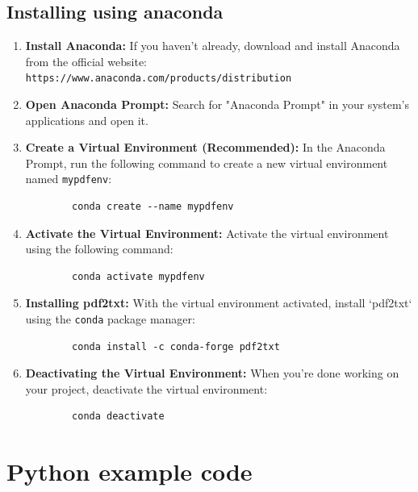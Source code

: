 \subsection{Installing using anaconda}

\begin{enumerate}[label=Step \arabic*:, leftmargin=*]
	\item \textbf{Install Anaconda:} If you haven't already, download and install Anaconda from the official website: \\
	\texttt{https://www.anaconda.com/products/distribution}
	
	\item \textbf{Open Anaconda Prompt:} Search for "Anaconda Prompt" in your system's applications and open it.
	
	\item \textbf{Create a Virtual Environment (Recommended):} In the Anaconda Prompt, run the following command to create a new virtual environment named \texttt{mypdfenv}:
	
	\begin{verbatim}
		conda create --name mypdfenv
	\end{verbatim}
	
	\item \textbf{Activate the Virtual Environment:} Activate the virtual environment using the following command:
	
	\begin{verbatim}
		conda activate mypdfenv
	\end{verbatim}
	
	\item \textbf{Installing pdf2txt:} With the virtual environment activated, install `pdf2txt` using the \texttt{conda} package manager:
	
	\begin{verbatim}
		conda install -c conda-forge pdf2txt
	\end{verbatim}
	
	\item \textbf{Deactivating the Virtual Environment:} When you're done working on your project, deactivate the virtual environment:
	
	\begin{verbatim}
		conda deactivate
	\end{verbatim}
\end{enumerate}


\section{Python example code}

